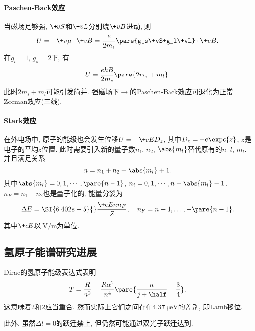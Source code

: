 \documentclass[hidelinks]{ctexart}
\begin{document}
\paragraph{Paschen-Back效应} %
\label{par:paschen_back效应}

当磁场足够强, $\+vS$和$\+vL$分别绕$\+vB$进动, 则
\[ U = -\+v\mu\cdot\+vB = \frac{e}{2m_e}\pare{g_s\+vS+g_l\+vL}\cdot\+vB. \]
在$g_l = 1$, $g_s = 2$下, 有
\[ U = \frac{e\hbar B}{2m_e}\pare{2m_s+m_l}. \]
此时$2m_s+m_l$可能引发简并. 强磁场下$\rightarrow$的Paschen-Back效应可退化为正常Zeeman效应(三线).


\paragraph{Stark效应} %
\label{par:stark效应}

在外电场中, 原子的能级也会发生位移$U = - \+cE D_z$, 其中$D_z = -e\expc{z}$, $z$是电子的平均$z$位置. 此时需要引入新的量子数$n_1$, $n_2$, $\abs{m_l}$替代原有的$n$, $l$, $m_l$. 并且满足关系
\[ n = n_1 + n_2 + \abs{m_l} + 1. \]
其中$\abs{m_l} = 0,1,\cdots,\pare{n-1}$, $n_i = 0,1,\cdots,n-\abs{m_l} - 1$. $n_F=n_1 - n_2$也是量子化的, 能量分裂为
\[ \Delta E = \SI{6.402e-5}{}\frac{\+cE nn_F}{Z}, \quad n_F = n-1,\dots,-\pare{n-1}. \]
其中$\+cE$以$\SI{}{\volt\per\meter}$为单位.



\subsection{氢原子能谱研究进展} %
\label{sub:氢原子能谱研究进展}

Dirac的氢原子能级表达式表明
\[ T = \frac{R}{n^2} + \frac{R\alpha^2}{n^4}\pare{\frac{n}{\displaystyle j+\half} - \frac{3}{4}}. \]
这意味着2和2应当重合. 然而实际上它们之间存在$\SI{4.37}{\micro\eV}$的差别, 即Lamb移位.
\par
此外, 虽然$\Delta l = 0$的跃迁禁止, 但仍然可能通过双光子跃迁达到.


\end{document}
